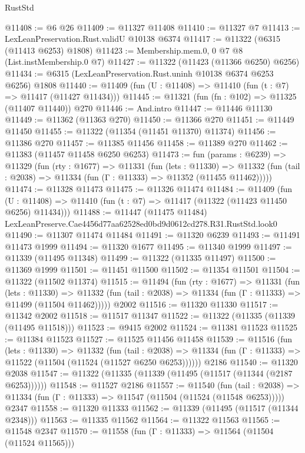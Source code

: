\begin{lexlean}{RustStd}
\begin{coremodule}
@11408 := @6 @26
@11409 := @11327 @11408
@11410 := @11327 @7
@11413 := LexLeanPreservation.Rust.validU @10138 @6374
@11417 := @11322 (@6315 (@11413 @6253) @1808)
@11423 := Membership.mem.{0, 0} @7 @8 (List.instMembership.{0} @7)
@11427 := @11322 (@11423 (@11366 @6250) @6256)
@11434 := @6315 (LexLeanPreservation.Rust.uninh @10138 @6374 @6253 @6256) @1808
@11440 := @11409 (fun (U : @11408) => @11410 (fun (t : @7) => @11417 (@11427 @11434)))
@11445 := @11321 (fun (fn : @102) => @11325 (@11407 @11440)) @270
@11446 := And.intro
@11447 := @11446 @11130
@11449 := @11362 (@11363 @270)
@11450 := @11366 @270
@11451 := @11449 @11450
@11455 := @11322 (@11354 (@11451 @11370) @11374)
@11456 := @11386 @270
@11457 := @11385 @11456
@11458 := @11389 @270
@11462 := @11383 (@11457 @11458 @6250 @6253)
@11473 := fun (params : @6239) =>
  @11329
    (fun (rty : @1677) =>
    @11331
      (fun (lets : @11330) =>
      @11332 (fun (tail : @2038) => @11334 (fun (Γ : @11333) => @11352 (@11455 @11462)))))
@11474 := @11328 @11473
@11475 := @11326 @11474
@11484 := @11409
    (fun (U : @11408) => @11410 (fun (t : @7) => @11417 (@11322 (@11423 @11450 @6256) @11434)))
@11488 := @11447 (@11475 @11484) LexLeanPreserve.Cae4456d77aa62528ed0bd9d0612cd278.R31.RustStd.look0
@11490 := @11307 @11474 @11484
@11491 := @11320 @6239
@11493 := @11491 @11473 @1999
@11494 := @11320 @1677
@11495 := @11340 @1999
@11497 := @11339 (@11495 @11348)
@11499 := @11322 (@11335 @11497)
@11500 := @11369 @1999
@11501 := @11451 @11500
@11502 := @11354 @11501
@11504 := @11322 (@11502 @11374)
@11515 := @11494
    (fun (rty : @1677) =>
    @11331
      (fun (lets : @11330) =>
      @11332 (fun (tail : @2038) => @11334 (fun (Γ : @11333) => @11499 (@11504 @11462)))))
    @2002
@11516 := @11320 @11330
@11517 := @11342 @2002
@11518 := @11517 @11347
@11522 := @11322 (@11335 (@11339 (@11495 @11518)))
@11523 := @9415 @2002
@11524 := @11381 @11523
@11525 := @11384 @11523
@11527 := @11525 @11456 @11458
@11539 := @11516
    (fun (lets : @11330) =>
    @11332
      (fun (tail : @2038) =>
      @11334 (fun (Γ : @11333) => @11522 (@11504 (@11524 (@11527 @6250 @6253))))))
    @2186
@11540 := @11320 @2038
@11547 := @11322 (@11335 (@11339 (@11495 (@11517 (@11344 (@2187 @6253))))))
@11548 := @11527 @2186
@11557 := @11540
    (fun (tail : @2038) => @11334 (fun (Γ : @11333) => @11547 (@11504 (@11524 (@11548 @6253)))))
    @2347
@11558 := @11320 @11333
@11562 := @11339 (@11495 (@11517 (@11344 @2348)))
@11563 := @11335 @11562
@11564 := @11322 @11563
@11565 := @11548 @2347
@11570 := @11558 (fun (Γ : @11333) => @11564 (@11504 (@11524 @11565)))

\end{coremodule}
\end{lexlean}
